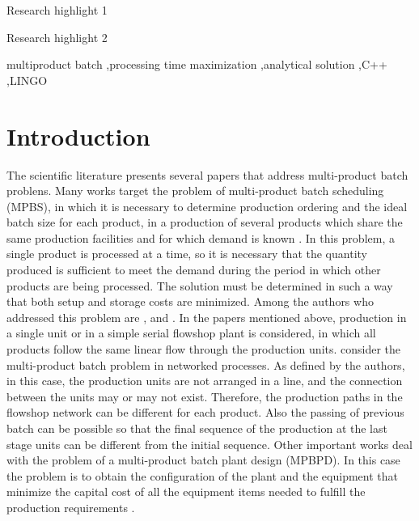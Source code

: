 \documentclass[preprint,12pt,authoryear]{elsarticle}
\begin{document}
\begin{frontmatter}
\begin{highlights}
\item Research highlight 1
\item Research highlight 2
\end{highlights}

\begin{keyword}
multiproduct batch \sep processing time maximization \sep analytical solution \sep C++ \sep LINGO



\end{keyword}

\end{frontmatter}


\section{Introduction}
\label{sec:intro}

The scientific literature presents several papers that address multi-product batch problens. Many works target the problem of multi-product batch scheduling (MPBS), in which it is necessary to determine production ordering and the ideal batch size for each product, in a production of several products which share the same production facilities and for which demand is known \citep{Eilon1985}. In this problem, a single product is processed at a time, so it is necessary that the quantity produced is sufficient to meet the demand during the period in which other products are being processed. The solution must be determined in such a way that both setup and storage costs are minimized. Among the authors who addressed this problem are \cite{Eilon1985}, \cite{Omega1993} and \cite{LiuEtAl2020}. In the papers mentioned above, production in a single unit or in a  simple serial flowshop plant is considered, in which all products follow the same linear flow through the production units. \cite{KimEtAl1996} consider the multi-product batch problem in networked processes. As defined by the authors, in this case, the production units are not arranged in a line, and the connection between the units may or may not exist. Therefore, the production paths in the flowshop network can be different for each product. Also the passing of previous batch can be possible so that the final sequence of the production at the last stage units can be different from the initial sequence. Other important works deal with the problem of a multi-product batch plant design (MPBPD). In this case the problem is to obtain the configuration of the plant and the equipment that minimize the capital cost of all the equipment items needed to fulfill the production requirements \citep{RavemarkAndRippin1998}. 
\end{document}
